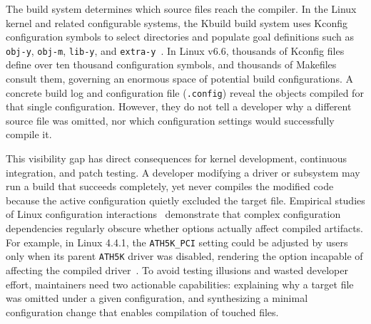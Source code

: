\documentclass[acmsmall]{acmart}
\begin{document}
The build system determines which source files reach the compiler.
In the Linux kernel and related configurable systems, the Kbuild build system uses Kconfig configuration symbols to select directories and populate goal definitions such as \texttt{obj-y}, \texttt{obj-m}, \texttt{lib-y}, and \texttt{extra-y}~\cite{berger2010variability,berger2013variability,dietrich2012variability,dietrich2018variability}.
In Linux v6.6, thousands of Kconfig files define over ten thousand configuration symbols, and thousands of Makefiles consult them, governing an enormous space of potential build configurations.
A concrete build log and configuration file (\texttt{.config}) reveal the objects compiled for that single configuration.
However, they do not tell a developer why a different source file was omitted, nor which configuration settings would successfully compile it.

This visibility gap has direct consequences for kernel development, continuous integration, and patch testing.
A developer modifying a driver or subsystem may run a build that succeeds completely, yet never compiles the modified code because the active configuration quietly excluded the target file.
Empirical studies of Linux configuration interactions~\cite{passos2013coevolution,melo2016variability,nadi2014where,nadi2014mining,abal2014variability,tartler2011dead} demonstrate that complex configuration dependencies regularly obscure whether options actually affect compiled artifacts.
For example, in Linux 4.4.1, the \texttt{ATH5K\_PCI} setting could be adjusted by users only when its parent \texttt{ATH5K} driver was disabled, rendering the option incapable of affecting the compiled driver~\cite{passos2013coevolution}.
To avoid testing illusions and wasted developer effort, maintainers need two actionable capabilities: explaining why a target file was omitted under a given configuration, and synthesizing a minimal configuration change that enables compilation of touched files.
\end{document}
